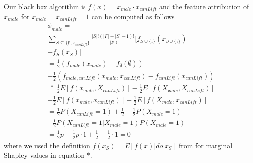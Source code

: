 Our black box algorithm is $f(x)=x_{male}\cdot x_{canLift}$ and the feature attribution of $x_{male}$ for $x_{male}=x_{canLift}=1$ can be computed as follows
\begin{align*}
    & \phi_{male} = \\&  \sum_{S\subseteq \{\emptyset, x_{canLift}\}} \frac{|S| !(|F|-|S|-1) !}{|F| !} [f_{S \cup\{i\}}\left(x_{S \cup\{i\}}\right) \\& -f_{S}\left(x_{S}\right) ]\\
    & = \frac{1}{2} (f_{male}(x_{male})-f_{\emptyset}(\emptyset)) \\& + \frac{1}{2} (f_{male, canLift}(x_{male}, x_{canLift}) - f_{canLift}(x_{canLift}))\\
    & \overset{*}{=} \frac{1}{2}E[f(x_{male}, X_{canLift})] - \frac{1}{2}E[f(X_{male}, X_{canLift})] \\& + \frac{1}{2} E[f(x_{male}, x_{canLift})] - \frac{1}{2} E[f(X_{male}, x_{canLift})]\\
    & = \frac{1}{2}P(X_{canLift}=1) + \frac{1}{2} - \frac{1}{2} P(X_{male}=1) \\& - \frac{1}{2}P(X_{canLift}=1|X_{male}=1)P(X_{male}=1) \\
    & = \frac{1}{2}p - \frac{1}{2}p\cdot 1 + \frac{1}{2} - \frac{1}{2}\cdot 1 = 0
\end{align*}
where we used the definition $f(x_S)=E[f(x)|do\;x_S]$ from \cite{janzing2020feature} for marginal Shapley values in equation $*$.


